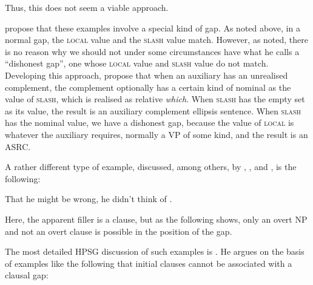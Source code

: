 \documentclass[output=paper
                ,modfonts
                ,nonflat
	        ,collection
	        ,collectionchapter
	        ,collectiontoclongg
 	        ,biblatex
                ,babelshorthands
                ,newtxmath
                ,draftmode
                ,colorlinks, citecolor=brown
]{./langsci/langscibook}
\begin{document}
{\begin{exe}
\begin{xlist}
\end{xlist}
\end{exe}

\noindent
Thus, this does not seem a viable approach.

\citet{Arnold:Borsley:10} propose that these examples involve a special
kind of gap. As noted above, in a normal gap, the \textsc{local} value and the
\textsc{slash} value match. However, as \citet{webelhuth08} noted, there is no
reason why we should not under some circumstances have what he calls a
``dishonest gap'', one whose \textsc{local} value and \textsc{slash} value do not match.
Developing this approach, \citet{Arnold:Borsley:10} propose that when an
auxiliary has an unrealised complement, the complement optionally has a
certain kind of nominal as the value of \textsc{slash}, which is realised as
relative \emph{which}. When \textsc{slash} has the empty set as its value, the
result is an auxiliary complement ellipsis sentence. When \textsc{slash} has the
nominal value, we have a dishonest gap, because the value of \textsc{local} is
whatever the auxiliary requires, normally a VP of some kind, and the
result is an ASRC.

A rather different type of example, discussed, among others, by
\citet{Bresnan01}, \citet{Bouma:Malouf:Sag:01}, and \citet{Webelhuth:12},
is the following:

\begin{exe}
\ex  \label{ex:UDC:ThatHeMightBeWrong}  That he might be wrong, he didn't think of \trace{}.
\end{exe}

\noindent
Here, the apparent filler is a clause, but as the following shows, only
an overt NP and not an overt clause is possible in the position of the
gap.

\begin{exe}
\ex
\begin{xlist}
\end{xlist}
\end{exe}

\noindent
The most detailed HPSG discussion of such examples is \citet{Webelhuth:12}.
He argues on the basis of examples like the following that initial
clauses cannot be associated with a clausal gap:

\begin{exe} \ex \begin{xlist} 
\end{xlist}
\end{exe}

}
\end{document}
